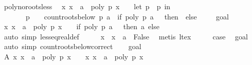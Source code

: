 \begin{isabellebody}
\endisatagproof
{\isafoldproof}%
%
\isadelimproof
\isanewline
%
\endisadelimproof
\isanewline
{}\isamarkupfalse%
\ poly{\isacharunderscore}no{\isacharunderscore}roots{\isacharunderscore}less{\isacharcolon}\isanewline
\ \ {\isachardoublequoteopen}{\isacharparenleft}{\isasymforall}x{\isachardot}\ x\ {\isacharless}\ a\ {\isasymlongrightarrow}\ poly\ p\ x\ {\isasymnoteq}\ {}{\isacharparenright}\ {\isasymlongleftrightarrow}\ {\isacharparenleft}let\ p\ {\isacharequal}\ p\ in\isanewline
\ \ \ \ \ \ \ {\isacharparenleft}p\ {\isasymnoteq}\ {}\ {\isasymand}\ count{\isacharunderscore}roots{\isacharunderscore}below\ p\ a\ {\isacharequal}\ {\isacharparenleft}if\ poly\ p\ a\ {\isacharequal}\ {}\ then\ {}\ else\ {}{\isacharparenright}{\isacharparenright}{\isacharparenright}{\isachardoublequoteclose}\isanewline
%
\isadelimproof
%
\endisadelimproof
%
\isatagproof
{}\isamarkupfalse%
\isanewline
\ \ \isamarkupfalse%
\ goal{}\isanewline
\ \ \isamarkupfalse%
\ {\isachardoublequoteopen}{\isacharbraceleft}x{\isachardot}\ x\ {\isasymle}\ a\ {\isasymand}\ poly\ p\ x\ {\isacharequal}\ {}{\isacharbraceright}\ {\isacharequal}\ {\isacharparenleft}if\ poly\ p\ a\ {\isacharequal}\ {}\ then\ {\isacharbraceleft}a{\isacharbraceright}\ else\ {\isacharbraceleft}{\isacharbraceright}{\isacharparenright}{\isachardoublequoteclose}\isanewline
\ \ \ \ \ \ \isamarkupfalse%
\ {\isacharparenleft}auto\ simp{\isacharcolon}\ less{\isacharunderscore}eq{\isacharunderscore}real{\isacharunderscore}def{\isacharparenright}\isanewline
\ \ \isamarkupfalse%
\ \isamarkupfalse%
\ {\isachardoublequoteopen}{\isasymforall}x{\isachardot}\ {\isasymnot}\ x\ {\isacharless}\ a\ {\isasymLongrightarrow}\ False{\isachardoublequoteclose}\ \isamarkupfalse%
\ {\isacharparenleft}metis\ lt{\isacharunderscore}ex{\isacharparenright}\isanewline
\ \ \isamarkupfalse%
\ \isamarkupfalse%
\ {\isacharquery}case\ \isamarkupfalse%
\ goal{}\ \isamarkupfalse%
\ {\isacharparenleft}auto\ simp{\isacharcolon}\ count{\isacharunderscore}roots{\isacharunderscore}below{\isacharunderscore}correct{\isacharparenright}\isanewline
{}\isamarkupfalse%
\isanewline
\ \ \isamarkupfalse%
\ goal{}\isanewline
\ \ \isamarkupfalse%
\ A{\isacharcolon}\ {\isachardoublequoteopen}{\isacharbraceleft}x{\isachardot}\ x\ {\isasymle}\ a\ {\isasymand}\ poly\ p\ x\ {\isacharequal}\ {}{\isacharbraceright}\ {\isacharequal}\ {\isacharbraceleft}x{\isachardot}\ x\ {\isacharless}\ a\ {\isasymand}\ poly\ p\ x\ {\isacharequal}\ {}{\isacharbraceright}\ {\isasymunion}\ \isanewline

\end{isabellebody}
